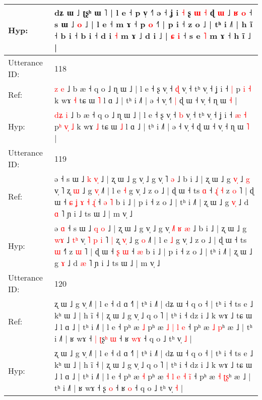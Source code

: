 \documentclass[10pt]{article}
\DeclareRobustCommand{\hl}[1]{{\textcolor{red}{#1}}}
\begin{document}
\begin{longtable}{ll}
 \\
Hyp: & dʑ ɯ ˩ ʈʂʰ ɯ ˥ | l e ˧ p v̩ ˧\hl{˥} ə ˧ ʝ i \hl{˧} ʂ \hl{}\hl{ɯ} \hl{˧} ɖ \hl{}\hl{ɯ} ˩ \hl{ʁ} \hl{o} ˧ s ɯ ˩\hl{}\hl{} \hl{}\hl{o} ˩ | l e ˧ m ɤ ˧ p \hl{}\hl{o} ˧\hl{˥} | p i ˧ z o ˩ | tʰ i ˩˥ | h ĩ ˧\hl{}\hl{} b i ˧ b i ˧ d i \hl{˧} m ɤ ˩ d i ˩ | \hl{ɕ} \hl{i} ˧ s e\hl{}\hl{} \hl{˥} m ɤ ˧ h ĩ ˩ |
 \\
\midrule
Utterance ID: & 118 \\
Ref: & \hl{}\hl{z} \hl{e} ˩ b æ ˧ q o ˩ ɳ ɯ ˩ | l e ˧ ʂ v̩ ˧ \hl{ɖ} v̩ ˧ tʰ v̩ ˧ ʝ i ˧\hl{}\hl{} \hl{|} p\hl{} \hl{}\hl{i} \hl{˧} k wɤ \hl{˧} tɕ ɯ \hl{˥} l ɑ ˩ | tʰ i ˩˥ | ə ˧ v̩ ˧\hl{˥}\hl{ }\hl{|} ɖ ɯ ˧ v̩ ˧ ɳ ɯ \hl{˧} |
 \\
Hyp: & \hl{d}\hl{ʑ} \hl{i} ˩ b æ ˧ q o ˩ ɳ ɯ ˩ | l e ˧ ʂ v̩ ˧ \hl{b} v̩ ˧ tʰ v̩ ˧ ʝ i ˧\hl{ }\hl{æ} \hl{˧} p\hl{ʰ} \hl{v}\hl{̩} \hl{˩} k wɤ \hl{˩} tɕ ɯ \hl{˩} l ɑ ˩ | tʰ i ˩˥ | ə ˧ v̩ ˧\hl{}\hl{}\hl{} ɖ ɯ ˧ v̩ ˧ ɳ ɯ \hl{˥} |
 \\
\midrule
Utterance ID: & 119 \\
Ref: & ə\hl{}\hl{} ˧ s ɯ ˩ \hl{k} \hl{v}\hl{̩} ˩ | ʐ ɯ ˩ g v̩ ˩ g v̩ \hl{}˥\hl{}\hl{} \hl{ə} ˩ b i ˩ | ʐ ɯ ˩ g \hl{v}\hl{̩} ˩ \hl{}\hl{g} v̩\hl{}\hl{}\hl{}\hl{}\hl{}\hl{} ˥\hl{}\hl{} ʐ \hl{}\hl{ɯ} ˩ g \hl{v}\hl{̩} ˩˥ | l e \hl{˧} g v̩ ˩ z o ˩ | ɖ ɯ ˧ ts \hl{ɑ} ˧\hl{ }\hl{ɻ}\hl{̍}\hl{ }\hl{˧} z \hl{o} ˥ | ɖ ɯ ˧\hl{ }\hl{ɕ}\hl{ }\hl{ʝ}\hl{ }\hl{ɤ} \hl{˧} \hl{ɻ}\hl{̍} ˧\hl{ }\hl{ə} \hl{˥} b i ˩ | p i ˧ z o ˩ | tʰ i ˩˥ | ʐ ɯ ˩ g \hl{v}\hl{̩} ˩ d \hl{ɑ} ˥ ɲ i ˩ ts ɯ ˩ | m v̩ ˩
 \\
Hyp: & ə\hl{ }\hl{ɑ} ˧ s ɯ ˩ \hl{q} \hl{}\hl{o} ˩ | ʐ ɯ ˩ g v̩ ˩ g v̩ \hl{˩}˥\hl{ }\hl{ʁ} \hl{æ} ˩ b i ˩ | ʐ ɯ ˩ g \hl{w}\hl{ɤ} ˩ \hl{t}\hl{ʰ} v̩\hl{ }\hl{˥}\hl{ }\hl{p}\hl{ }\hl{i} ˥\hl{ }\hl{|} ʐ \hl{v}\hl{̩} ˩ g \hl{}\hl{o} ˩˥ | l e \hl{˩} g v̩ ˩ z o ˩ | ɖ ɯ ˧ ts \hl{ɯ} ˧\hl{}\hl{}\hl{}\hl{}\hl{˥} z \hl{ɯ} ˥ | ɖ ɯ ˧\hl{}\hl{}\hl{}\hl{}\hl{}\hl{} \hl{ʂ} \hl{}\hl{ɯ} ˧\hl{}\hl{} \hl{æ} b i ˩ | p i ˧ z o ˩ | tʰ i ˩˥ | ʐ ɯ ˩ g \hl{}\hl{ɤ} ˩ d \hl{æ} ˥ ɲ i ˩ ts ɯ ˩ | m v̩ ˩
 \\
\midrule
Utterance ID: & 120 \\
Ref: & ʐ ɯ ˩ g v̩ ˩˥ | l e ˧ d ɑ ˧˥ | tʰ i ˩˥ | dʑ ɯ ˧ q o ˧ | tʰ i ˧ ts e ˩ kʰ ɯ ˩ | h ĩ ˧ | ʐ ɯ ˩ g v̩ ˩ q o ˥ | tʰ i ˧ dz i ˩ k wɤ ˩ tɕ ɯ ˩ l ɑ ˩ | tʰ i ˩˥ | l e ˧ pʰ æ \hl{˩} pʰ æ\hl{}\hl{} \hl{˩} \hl{|} \hl{l} \hl{}\hl{e} ˧ pʰ æ \hl{˩} \hl{}\hl{p}ʰ æ ˩ | tʰ i ˩˥ | ʁ wɤ ˧\hl{ }\hl{|} \hl{ʈ}ʂ\hl{ʰ} \hl{ɯ} ˧ ʁ \hl{w}\hl{ɤ} ˧ q o ˩ tʰ v̩ \hl{˩} |
 \\
Hyp: & ʐ ɯ ˩ g v̩ ˩˥ | l e ˧ d ɑ ˧˥ | tʰ i ˩˥ | dʑ ɯ ˧ q o ˧ | tʰ i ˧ ts e ˩ kʰ ɯ ˩ | h ĩ ˧ | ʐ ɯ ˩ g v̩ ˩ q o ˥ | tʰ i ˧ dz i ˩ k wɤ ˩ tɕ ɯ ˩ l ɑ ˩ | tʰ i ˩˥ | l e ˧ pʰ æ \hl{˧} pʰ æ\hl{ }\hl{˧} \hl{l} \hl{e} \hl{˧} \hl{i}\hl{̃} ˧ pʰ æ \hl{˧} \hl{ʈ}\hl{ʂ}ʰ æ ˩ | tʰ i ˩˥ | ʁ wɤ ˧\hl{}\hl{} \hl{}ʂ\hl{} \hl{o} ˧ ʁ \hl{}\hl{o} ˧ q o ˩ tʰ v̩ \hl{˧} |

\end{longtable}
\end{document}
